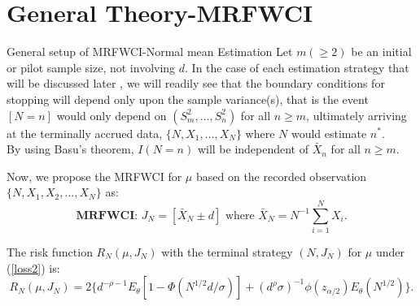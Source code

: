 \documentclass [xcolor=svgnames, t] {beamer}
\begin{document}
\section{General Theory-MRFWCI}
\begin{frame}{General setup of MRFWCI-Normal mean Estimation}
\vspace{5mm}
Let $m(\geq 2)$ be an initial or pilot sample size, not involving $d$. In the case of 
each estimation strategy that will be discussed later ,  we will readily see that the boundary 
conditions for stopping will depend only upon the sample variance(s), that is the event $[N=n]$ 
would only depend on $(S_m^2,\dots,S_n^2)$ for all $n \geq m$, ultimately arriving at the terminally accrued data, 
$\{N,X_1,\dots,X_N\}$ where $N$ would estimate $n^*$. \\
\vspace{0.4cm}
By using Basu's theorem, $I(N=n)$ will be independent of $\bar{X}_n$ for all $n \geq m$. \\
\vspace{0.1cm}
\end{frame}

\begin{frame}
\vspace{10mm}
Now, we propose the MRFWCI for $\mu$ based on the recorded observation $\{N,X_1,X_2,\dots ,X_N\}$ as:
    \begin{equation*}
    \textbf{MRFWCI: }J_N=[\bar{X}_N \pm d] \text{ where }\bar{X}_N=N^{-1} \sum_{i=1}^N{X_i}.    
    \end{equation*}
    
    The risk function $R_N(\mu,J_N)$ with the terminal strategy $(N,J_N)$ for $\mu$ under (\ref{loss2}) is:
    \begin{equation*}
        R_N(\mu,J_N) = 2\{ d^{-\rho-1} E_{\theta}[1-\Phi(N^{1/2}d/\sigma)]+ (d^{\rho}\sigma)^{-1}\phi(z_{\alpha/2})E_{\theta}(N^{1/2})\}.
    \end{equation*}
    
    
\end{frame}

\end{document}
